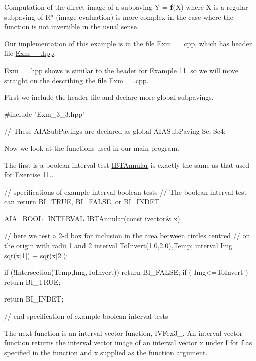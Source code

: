 \-Computation of the direct image of a subpaving \-Y = {\bfseries f}(\-X) where \-X is a regular subpaving of \-R$^{\mbox{n}}$  (image evaluation) is more complex in the case where the function is not invertible in the usual sense.

\-Our implementation of this example is in the file \hyperlink{Exm__3__3_8cpp}{\-Exm\-\_\-\_.\-cpp}, which has header file \hyperlink{Exm__3__3_8hpp}{\-Exm\-\_\-\_.\-hpp}.

\hyperlink{Exm__3__3_8hpp}{\-Exm\-\_\-\_.\-hpp} shows is similar to the header for \-Example 11. so we will move straight on the describing the file \hyperlink{Exm__3__3_8cpp}{\-Exm\-\_\-\_.\-cpp}.



\-First we include the header file and declare more global subpavings.


\begin{DoxyCodeInclude}
#include "Exm_3_3.hpp"

// These AIASubPavings are declared as global
AIASubPaving Sc, Sc4;

\end{DoxyCodeInclude}


\-Now we look at the functions used in our main program.

\-The first is a boolean interval test \hyperlink{AIASubPavings_IBTAnnular}{\-I\-B\-T\-Annular} is exactly the same as that used for \-Exercise 11..


\begin{DoxyCodeInclude}
// specifications of example interval boolean tests
// The boolean interval test can return BI_TRUE, BI_FALSE, or BI_INDET

AIA_BOOL_INTERVAL IBTAnnular(const ivector& x)
{
  // here we test a 2-d box for inclusion in the area between circles centred 
  // on the origin with radii 1 and 2
  interval ToInvert(1.0,2.0),Temp;
  interval Img = sqr(x[1]) + sqr(x[2]);

  if (!Intersection(Temp,Img,ToInvert)) return BI_FALSE;
  if ( Img<=ToInvert ) return BI_TRUE;

  return BI_INDET;
}

// end specification of example boolean interval tests

\end{DoxyCodeInclude}


\-The next function is an interval vector function, \label{AIASubPavings_IVFex3_3}%
\hypertarget{AIASubPavings_IVFex3_3}{}%
\-I\-V\-Fex3\-\_. \-An interval vector function returns the interval vector image of an interval vector x under {\bfseries f} for {\bfseries f} as specified in the function and x supplied as the function argument.

